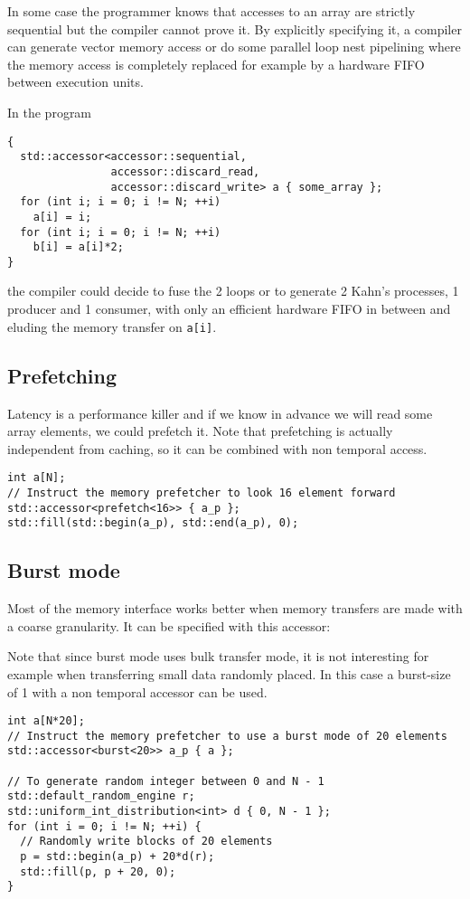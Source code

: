 \documentclass[a4paper]{article}
\begin{document}
In some case the programmer knows that accesses to an array are
strictly sequential but the compiler cannot prove it. By explicitly
specifying it, a compiler can generate vector memory access or do some
parallel loop nest pipelining where the memory access is completely
replaced for example by a hardware FIFO between execution units.

In the program
\begin{lstlisting}
{
  std::accessor<accessor::sequential,
                accessor::discard_read,
                accessor::discard_write> a { some_array };
  for (int i; i = 0; i != N; ++i)
    a[i] = i;
  for (int i; i = 0; i != N; ++i)
    b[i] = a[i]*2;
}
\end{lstlisting}
the compiler could decide to fuse the 2 loops or to generate 2 Kahn's
processes, 1 producer and 1 consumer, with only an efficient hardware
FIFO in between and eluding the memory transfer on \lstinline|a[i]|.


\subsection{Prefetching}
\label{sec:prefetching}

Latency is a performance killer and if we know in advance we will read
some array elements, we could prefetch it. Note that prefetching is
actually independent from caching, so it can be combined with non temporal
access.

\begin{lstlisting}
int a[N];
// Instruct the memory prefetcher to look 16 element forward
std::accessor<prefetch<16>> { a_p };
std::fill(std::begin(a_p), std::end(a_p), 0);
\end{lstlisting}


\subsection{Burst mode}
\label{sec:burst-mode}

Most of the memory interface works better when memory transfers are
made with a coarse granularity. It can be specified with this accessor:

Note that since burst mode uses bulk transfer mode, it is not
interesting for example when transferring small data randomly
placed. In this case a burst-size of 1 with a non temporal accessor
can be used.

\begin{lstlisting}
int a[N*20];
// Instruct the memory prefetcher to use a burst mode of 20 elements
std::accessor<burst<20>> a_p { a };

// To generate random integer between 0 and N - 1
std::default_random_engine r;
std::uniform_int_distribution<int> d { 0, N - 1 };
for (int i = 0; i != N; ++i) {
  // Randomly write blocks of 20 elements
  p = std::begin(a_p) + 20*d(r);
  std::fill(p, p + 20, 0);
}
\end{lstlisting}
\end{document}
